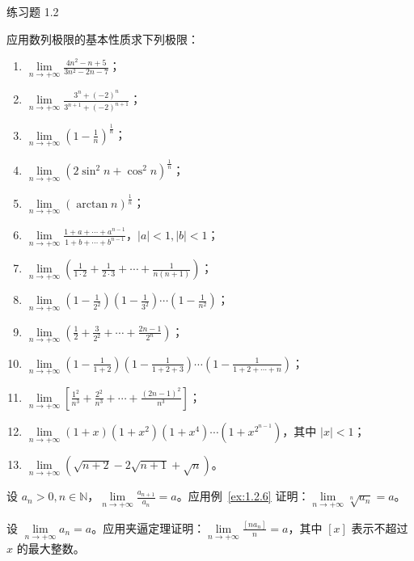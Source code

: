\begin{exblock}{练习题 1.2}
\item 应用数列极限的基本性质求下列极限：
\begin{enumerate}
  \item $\lim\limits_{n\to+\infty}\frac{4n^2-n+5}{3n^2-2n-7}$；
  \item $\lim\limits_{n\to+\infty}\frac{3^n+(-2)^n}{3^{n+1}+(-2)^{n+1}}$；
  \item $\lim\limits_{n\to+\infty}\left(1-\frac{1}{n}\right)^{\frac{1}{n}}$；
  \item $\lim\limits_{n\to+\infty}(2\sin^{2}n+\cos^{2}n)^{\frac{1}{n}}$；
  \item $\lim\limits_{n \to +\infty} (\operatorname{arctan} n)^{\frac{1}{n}}$；
  \item $\lim\limits_{n \to +\infty} \frac{1+a+\cdots+a^{n-1}}{1+b+\cdots+b^{n-1}}$，$|a|<1, |b|<1$；
  \item $\lim\limits_{n \to +\infty} \left( \frac{1}{1 \cdot 2} + \frac{1}{2 \cdot 3} + \cdots + \frac{1}{n(n+1)} \right)$；
  \item $\lim\limits_{n \to +\infty} \left(1 - \frac{1}{2^2}\right) \left(1 - \frac{1}{3^2}\right) \cdots \left(1 - \frac{1}{n^2}\right)$；
  \item $\lim\limits_{n \to +\infty} \left( \frac{1}{2} + \frac{3}{2^2} + \cdots + \frac{2n-1}{2^n} \right)$；
  \item $\lim\limits_{n \to +\infty} \left(1 - \frac{1}{1+2}\right) \left(1 - \frac{1}{1+2+3}\right) \cdots \left(1 - \frac{1}{1+2+\cdots+n}\right)$；
  \item $\lim\limits_{n \to +\infty} \left[ \frac{1^2}{n^3} + \frac{2^2}{n^3} + \cdots + \frac{(2n-1)^2}{n^3} \right]$；
  \item $\lim\limits_{n \to +\infty} (1 + x)(1 + x^2)(1 + x^4) \cdots (1 + x^{2^{n-1}})$，其中 $|x| < 1$；
  \item $\lim\limits_{n \to +\infty} (\sqrt{n+2} - 2\sqrt{n+1} + \sqrt{n})$。
\end{enumerate}

\item 设 $a_{n} > 0, n \in \mathbb{N}$，$\lim\limits_{n \to +\infty} \frac{a_{n+1}}{a_n} = a$。应用例~\ref{ex:1.2.6} 证明：$\lim\limits_{n \to +\infty} \sqrt[n]{a_n} = a$。

\item 设 $\lim\limits_{n \to +\infty} a_n = a$。应用夹逼定理证明：$\lim\limits_{n \to +\infty} \frac{[na_n]}{n} = a$，其中 $[x]$ 表示不超过 $x$ 的最大整数。


\end{exblock}

